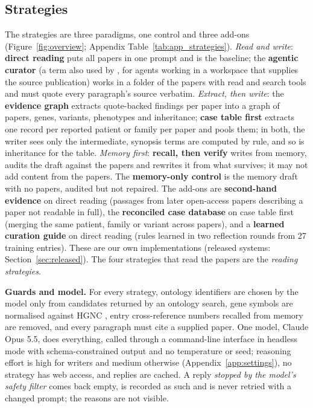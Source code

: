 \documentclass{article} %
\begin{document}
\subsection{Strategies}
\label{sec:strategies}
The strategies are three paradigms, one control and three add-ons (Figure~\ref{fig:overview}; Appendix Table~\ref{tab:app_strategies}). \emph{Read and write}: \textbf{direct reading} puts all papers in one prompt and is the baseline; the \textbf{agentic curator} (a term also used by \citealp{balhoff2026frontier}, for agents working in a workspace that supplies the source publication) works in a folder of the papers with read and search tools and must quote every paragraph's source verbatim. \emph{Extract, then write}: the \textbf{evidence graph} extracts quote-backed findings per paper into a graph of papers, genes, variants, phenotypes and inheritance; \textbf{case table first} extracts one record per reported patient or family per paper and pools them; in both, the writer sees only the intermediate, synopsis terms are computed by rule, and so is inheritance for the table. \emph{Memory first}: \textbf{recall, then verify} writes from memory, audits the draft against the papers and rewrites it from what survives; it may not add content from the papers. The \textbf{memory-only control} is the memory draft with no papers, audited but not repaired. The add-ons are \textbf{second-hand evidence} on direct reading (passages from later open-access papers describing a paper not readable in full), the \textbf{reconciled case database} on case table first (merging the same patient, family or variant across papers), and a \textbf{learned curation guide} on direct reading (rules learned in two reflection rounds from 27 training entries). These are our own implementations (released systems: Section~\ref{sec:released}). The four strategies that read the papers are the \emph{reading strategies}.

\textbf{Guards and model.} For every strategy, ontology identifiers are chosen by the model only from candidates returned by an ontology search, gene symbols are normalised against HGNC \citep{seal2023genenames}, entry cross-reference numbers recalled from memory are removed, and every paragraph must cite a supplied paper. One model, Claude Opus 5.5, does everything, called through a command-line interface in headless mode with schema-constrained output and no temperature or seed; reasoning effort is high for writers and medium otherwise (Appendix~\ref{app:settings}), no strategy has web access, and replies are cached. A reply \emph{stopped by the model's safety filter} comes back empty, is recorded as such and is never retried with a changed prompt; the reasons are not visible.
\end{document}
